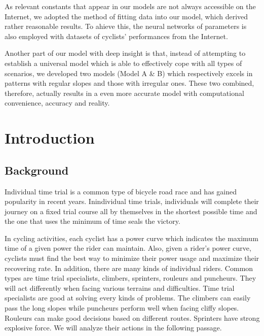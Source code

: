 \documentclass[14pt]{article}
\theoremstyle{definition}
\theoremstyle{remark}
\numberwithin{equation}{section}
\begin{document}
	As relevant constants that appear in our models are not always accessible on the Internet, we adopted the method of fitting data into our model, which derived rather reasonable results. To ahieve this, the neural networks of parameters is also employed with datasets of cyclists' performances from the Internet.

	Another part of our model with deep insight is that, instead of attempting to establish a universal model which is able to effectively cope with all types of scenarios, we developed two models (Model A \& B) which respectively excels in patterns with regular slopes and those with irregular ones. These two combined, therefore, actually results in a even more accurate model with computational convenience, accuracy and reality.
	

	\clearpage
    \newpage
    \pagestyle{empty}
    \setlength{\headheight}{12pt}
    \renewcommand{\headrulewidth}{0.5pt}
    \renewcommand{\footrulewidth}{0.0pt}
    \pagestyle{fancy}
    \cfoot{}
    \lfoot{}
    \rfoot{}

    \clearpage
    \thispagestyle{empty}
    \tableofcontents
    \newpage
    \pagestyle{fancy}
    \setcounter{page}{1}
	
	\newpage
	\section{Introduction}
	\subsection{Background}
	Individual time trial is a common type of bicycle road race and has gained popularity in recent years. Inindividual time trials, individuals will complete their journey on a fixed trial course all by themselves in the shortest possible time and the one that uses the minimum of time seals the victory.

	In cycling activities, each cyclist has a power curve which indicates the maximum time of a given power the rider can maintain. Also, given a rider's power curve, cyclists must find the best way to minimize their power usage and maximize their recovering rate. In addition, there are many kinds of individual riders. Common types are time trial specialists, climbers, sprinters, rouleurs and puncheurs. They will act differently when facing various terrains and difficulties. Time trial specialists are good at solving every kinds of problems. The climbers can easily pass the long slopes while puncheurs perform well when facing cliffy slopes. Rouleurs can make good decisions based on different routes. Sprinters have strong explosive force. We will analyze their actions in the following passage.
	
\end{document}
